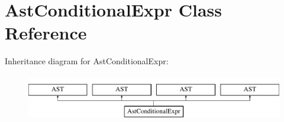 \hypertarget{classAstConditionalExpr}{\section{Ast\-Conditional\-Expr Class Reference}
\label{classAstConditionalExpr}
}
Inheritance diagram for Ast\-Conditional\-Expr\-:\begin{figure}[H]
\begin{center}
\leavevmode
\includegraphics[height=2.000000cm]{classAstConditionalExpr}
\end{center}
\end{figure}
